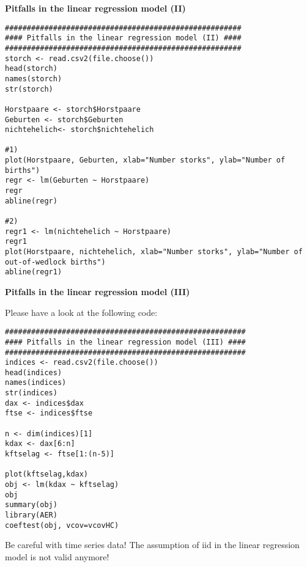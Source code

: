 \begin{Solution}{7.7}
\textbf{Pitfalls in the linear regression model (II)}

\begin{verbatim}
######################################################
#### Pitfalls in the linear regression model (II) ####
######################################################
storch <- read.csv2(file.choose())
head(storch)
names(storch)
str(storch)

Horstpaare <- storch$Horstpaare
Geburten <- storch$Geburten
nichtehelich<- storch$nichtehelich

#1)
plot(Horstpaare, Geburten, xlab="Number storks", ylab="Number of births")
regr <- lm(Geburten ~ Horstpaare)
regr
abline(regr)

#2)
regr1 <- lm(nichtehelich ~ Horstpaare)
regr1
plot(Horstpaare, nichtehelich, xlab="Number storks", ylab="Number of out-of-wedlock births")
abline(regr1)
\end{verbatim}
\end{Solution}
\begin{Solution}{7.8}
\textbf{Pitfalls in the linear regression model (III)}

Please have a look at the following code:
\begin{verbatim}
#######################################################
#### Pitfalls in the linear regression model (III) ####
#######################################################
indices <- read.csv2(file.choose())
head(indices)
names(indices)
str(indices)
dax <- indices$dax
ftse <- indices$ftse

n <- dim(indices)[1]
kdax <- dax[6:n]
kftselag <- ftse[1:(n-5)]

plot(kftselag,kdax)
obj <- lm(kdax ~ kftselag)
obj
summary(obj)
library(AER)
coeftest(obj, vcov=vcovHC)
\end{verbatim}
Be careful with time series data! The assumption of iid in the linear regression model is not valid anymore!
\end{Solution}
